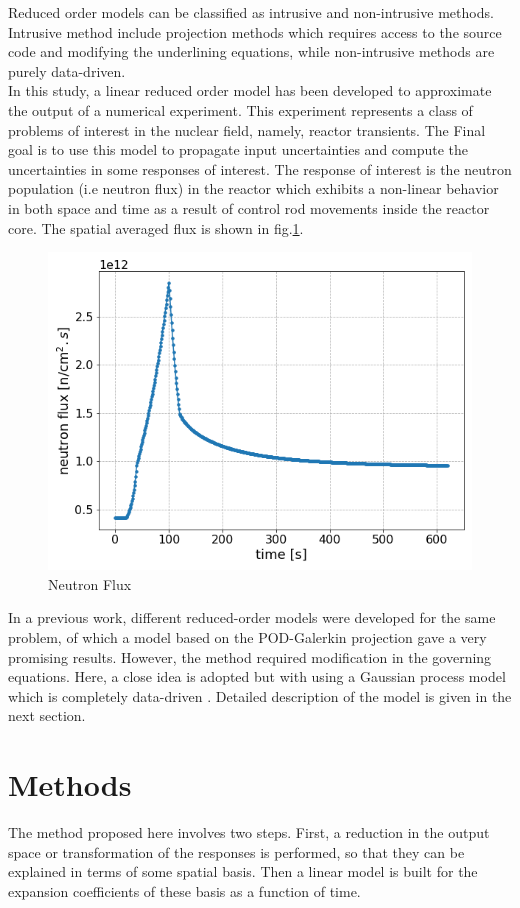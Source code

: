 \documentclass{anstrans}
\begin{document}
Reduced order models can be classified as intrusive and non-intrusive methods. Intrusive method include projection methods which requires access to the source code and modifying the underlining equations, while non-intrusive methods are purely data-driven.\\
In this study, a linear reduced order model has been developed to approximate the output of a numerical experiment. This experiment represents a class of problems of interest in the nuclear field, namely, reactor transients. 
The Final goal is to use this model to propagate input uncertainties and compute the uncertainties in some responses of interest.
The response of interest is the neutron population (i.e neutron flux) in the reactor which exhibits a non-linear behavior in both space and time as a result of control rod movements inside the reactor core. The spatial averaged flux is shown in fig.\ref{fig:neutron flux}.\\
\begin{figure}
    \centering
    \includegraphics[scale=0.4]{./figs/ave_flux.png}
    \caption{Neutron Flux}
    \label{fig:neutron flux}
\end{figure}
In a previous work, different reduced-order models were developed for the same problem, of which a model based on the POD-Galerkin projection gave a very promising results. 
However, the method required modification in the governing equations.
Here, a close idea is adopted but with using a Gaussian process model which is completely data-driven . 
Detailed description of the model is given in the next section.

\section{Methods}
The method proposed here involves two steps. First, a reduction in the output space or transformation of the responses is performed, so that they can be explained in terms of some spatial basis.
Then a linear model is built for the expansion coefficients of these basis as a function of time. 
\end{document}
